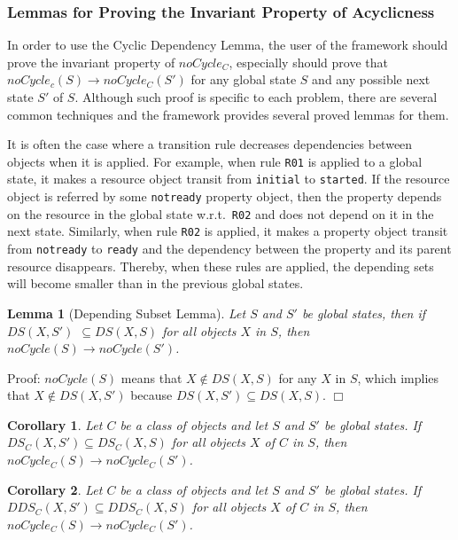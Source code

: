 \documentclass[12pt]{report}
\newtheorem{lemma}{Lemma}
\newtheorem{corollary}{Corollary}
\newcommand{\ra}{\rightarrow}
\begin{document}
\subsubsection{Lemmas for Proving the Invariant Property of Acyclicness}
In order to use the Cyclic Dependency Lemma, the user of the framework
should prove the invariant property of $noCycle_C$, especially should
prove that $noCycle_c(S) \ra noCycle_C(S')$ for any global state $S$
and any possible next state $S'$ of $S$\!. Although such proof is
specific to each problem, there are several common techniques and the
framework provides several proved lemmas for them.

It is often the case where a transition rule decreases dependencies
between objects when it is applied. For example, when rule {\tt R01}
is applied to a global state, it makes a resource object transit from
{\tt initial} to {\tt started}. If the resource object is referred by
some {\tt notready} property object, then the property depends on the
resource in the global state w.r.t.\ {\tt R02} and does not depend on it in the
next state. Similarly, when rule {\tt R02} is applied, it makes a
property object transit from {\tt notready} to {\tt ready} and the
dependency between the property and its parent resource disappears.
Thereby, when these rules are applied, the depending sets will become
smaller than in the previous global states.

\begin{lemma}[Depending Subset Lemma]
Let $S$ and $S'$ be global states, then if $DS(X,S')$ $\subseteq DS(X,S)$ for all
objects $X$ in $S$\!, then $noCycle(S) \ra noCycle(S')$.
\end{lemma}
Proof: $noCycle(S)$ means that $X\not\in DS(X,S)$ for any $X$ in $S$\!,
which implies that $X\not\in DS(X,S')$ because $DS(X,S')\subseteq
DS(X,S)$.  $\Box$

\begin{corollary}
Let $C$ be a class of objects and let $S$ and $S'$ be global states.  If
$\mathit{DS_C}(X,S')\subseteq \mathit{DS_C}(X,S)$ for all objects $X$ of $C$ in $S$\!,
then $noCycle_C(S) \ra noCycle_C(S')$.
\end{corollary}

\begin{corollary}
Let $C$ be a class of objects and let $S$ and $S'$ be global states.  If
$\mathit{DDS_C}(X,S')\subseteq \mathit{DDS_C}(X,S)$ for all objects $X$ of $C$ in $S$\!,
then $noCycle_C(S) \ra noCycle_C(S')$.
\end{corollary}
\end{document}
